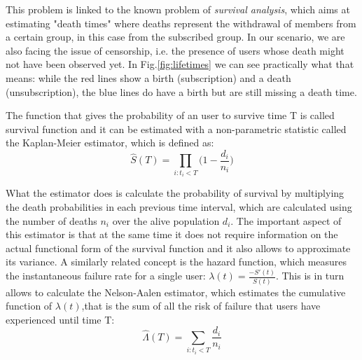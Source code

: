 \documentclass[paper=a4, fontsize=10pt]{report}
\begin{document}
This problem is linked to the known problem of \textit{survival analysis}, which aims at estimating "death times" where deaths represent the withdrawal of members from a certain group,
in this case from the subscribed group. In our scenario, we are also facing the issue of censorship, i.e. the presence of users whose death might not have been observed yet. In Fig.\ref{fig:lifetimes} we can see practically what that means: while the red lines show a birth (subscription)
and a death (unsubscription), the blue lines do have a birth but are still missing a death time.


The function that gives the probability of an user to survive time T is called survival function and it can be estimated
with a non-parametric statistic called the Kaplan-Meier estimator, which is defined as:
\begin{equation}
 \hat{S}(T) = \prod_{i: t_{i} < T} \Big(1 - \frac{d_{i}}{n_{i}} \Big)
\end{equation}


What the estimator does is calculate the probability of survival by multiplying the death probabilities in each previous time interval, which
are calculated using the number of deaths $n_{i}$ over the alive population $d_{i}$. The important aspect of this 
estimator is that at the same time it does not require information on the actual functional form of the survival function
and it also allows to approximate its variance. A similarly related concept is the hazard function, which measures
the instantaneous failure rate for a single user: $ \lambda (t) = \frac{-S'(t)}{S(t)}
$. This is in turn allows to calculate the Nelson-Aalen estimator, which estimates the cumulative function of $\lambda(t)$,that
is the sum of all the risk of failure that users have experienced until time T:
\begin{equation}
 \hat{\Lambda}(T) = \sum_{i: t_{i} < T}  \frac{d_{i}}{n_{i}}
\end{equation}
\end{document}
